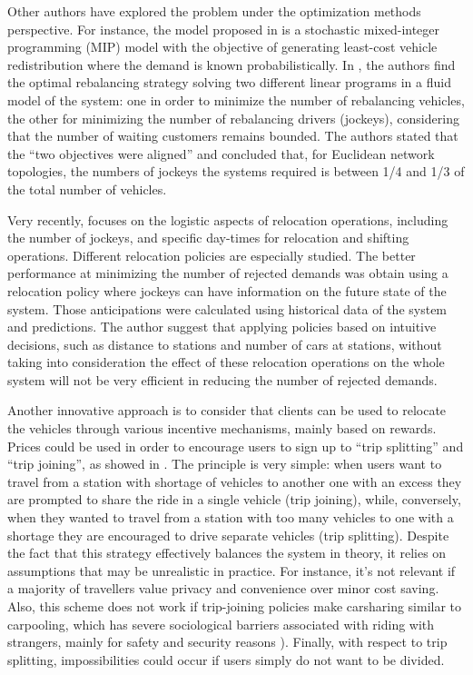 \medskip
Other authors have explored the problem under the optimization methods perspective.
For instance, the model proposed in \cite{nair_fleet_2011} is a stochastic mixed-integer programming (MIP) model with the objective of generating least-cost vehicle redistribution where the demand is known probabilistically.
In \cite{smith_rebalancing_2013}, the authors find the optimal rebalancing strategy solving two different linear programs in a fluid model of the system: one in order to minimize the number of rebalancing vehicles, the other for minimizing the number of rebalancing drivers (jockeys), considering that the number of waiting customers remains bounded.
The authors stated that the ``two objectives were aligned'' and concluded that, for Euclidean network topologies, the numbers of jockeys the systems required is between 1/4 and 1/3 of the total number of vehicles.

\medskip
Very recently, \cite{zakaria_optimization_2015} focuses on the logistic aspects of relocation operations, including the number of jockeys, and specific day-times for relocation and shifting operations.
Different relocation policies are especially studied.
The better performance at minimizing the number of rejected demands was obtain using a relocation policy where jockeys can have information on the future state of the system.
Those anticipations were calculated using historical data of the system and predictions. %
The author suggest that applying policies based on intuitive decisions, such as distance to stations and number of cars at stations, without taking into consideration the effect of these relocation operations on the whole system will not be very efficient in reducing the number of rejected demands.

\medskip
Another innovative approach is to consider that clients can be used to relocate the vehicles through various incentive mechanisms, mainly based on rewards.
Prices could be used in order to encourage users to sign up to ``trip splitting'' and ``trip joining'', as showed in \cite{barth_user_based_2004}.
The principle is very simple: when users want to travel from a station with shortage of vehicles to another one with an excess they are prompted to share the ride in a single vehicle (trip joining), while, conversely, when they wanted to travel from a station with too many vehicles to one with a shortage they are encouraged to drive separate vehicles (trip splitting).
Despite the fact that this strategy effectively balances the system in theory, it relies on assumptions that may be unrealistic in practice.
For instance, it's not relevant if a majority of travellers value privacy and convenience over minor cost saving.
Also, this scheme does not work if trip-joining policies make carsharing similar to carpooling, which has severe sociological barriers associated with riding with strangers, mainly for safety and security reasons \cite{chan_ridesharing_2012, correia_carpooling_2011}).
Finally, with respect to trip splitting, impossibilities could occur if users simply do not want to be divided.


